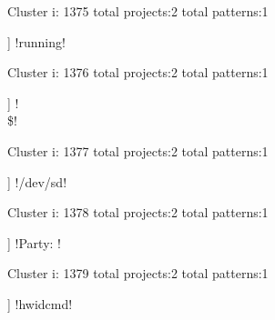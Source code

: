 Cluster i: 1375
total projects:2
total patterns:1
\begin{multicols}{1}
\begin{description}[noitemsep,topsep=0pt]
\item [[2] ] \cverb!running!
\end{description}
\end{multicols}







Cluster i: 1376
total projects:2
total patterns:1
\begin{multicols}{1}
\begin{description}[noitemsep,topsep=0pt]
\item [[2] ] \cverb!\\\$!
\end{description}
\end{multicols}







Cluster i: 1377
total projects:2
total patterns:1
\begin{multicols}{1}
\begin{description}[noitemsep,topsep=0pt]
\item [[2] ] \cverb!/dev/sd!
\end{description}
\end{multicols}







Cluster i: 1378
total projects:2
total patterns:1
\begin{multicols}{1}
\begin{description}[noitemsep,topsep=0pt]
\item [[2] ] \cverb!Party: !
\end{description}
\end{multicols}







Cluster i: 1379
total projects:2
total patterns:1
\begin{multicols}{1}
\begin{description}[noitemsep,topsep=0pt]
\item [[2] ] \cverb!hwidcmd!
\end{description}
\end{multicols}








